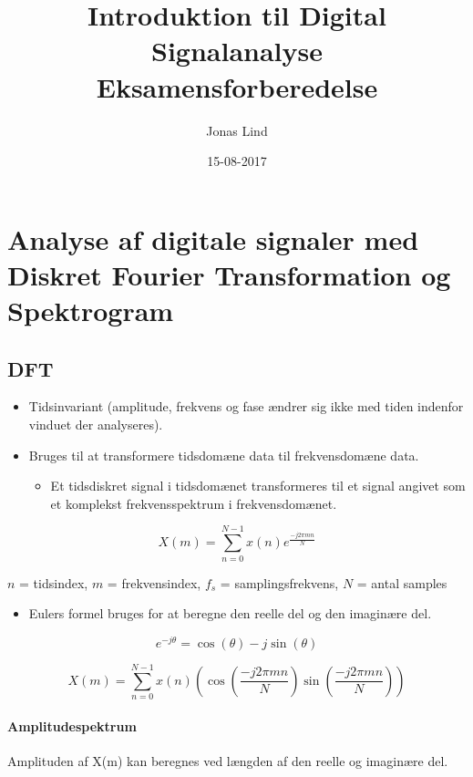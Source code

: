 \documentclass[danish]{article}
\begin{document}
\title{\textbf{Introduktion til Digital Signalanalyse }   Eksamensforberedelse}
\author{Jonas Lind}
\date{15-08-2017}
\maketitle
\tableofcontents
\newpage
\section{Analyse af digitale signaler med Diskret Fourier Transformation og Spektrogram}
\subsection{DFT}
\begin{itemize}
	\item Tidsinvariant (amplitude, frekvens og fase ændrer sig ikke med tiden indenfor vinduet der analyseres).
	\item Bruges til at transformere tidsdomæne data til frekvensdomæne data.
	\begin{itemize}
		\item Et tidsdiskret signal i tidsdomænet transformeres til et signal angivet som et komplekst frekvensspektrum i frekvensdomænet.
	\end{itemize}
\end{itemize}

\begin{equation}
X(m)=\sum_{n=0}^{N-1}x(n)e^{\frac{-j2\pi mn}{N}}
\end{equation}

{\setlength\parindent{24pt} $n$ = tidsindex, $m$ = frekvensindex, $f_s$ = samplingsfrekvens, $N$ = antal samples}

\begin{itemize}
	\item Eulers formel bruges for at beregne den reelle del og den imaginære del.
\end{itemize}

\begin{equation}
e^{-j\theta}=\cos(\theta) -j\sin(\theta)
\end{equation}

\begin{equation}
X(m)=\sum_{n=0}^{N-1}x(n)(\cos{\left(\frac{-j2\pi mn}{N}\right)}\sin{\left(\frac{-j2\pi mn}{N}\right)})
\end{equation}

\paragraph{Amplitudespektrum} Amplituden af X(m) kan beregnes ved længden af den reelle og imaginære del.
\end{document}
